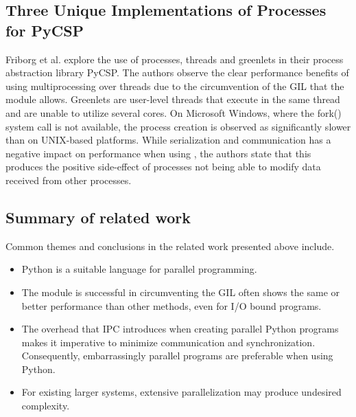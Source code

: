 \subsection{Three Unique Implementations of Processes for PyCSP}
Friborg et al. \cite{friborg_2009_three_tuiopfp} explore the use of processes, threads and greenlets in their process abstraction
library PyCSP. The authors observe the clear performance benefits of using multiprocessing over threads due to the circumvention of the GIL
that the  module allows. Greenlets are user-level threads that execute in the same thread and are unable to utilize
several cores. On Microsoft Windows, where the fork() system call is not available, the process creation is observed as
significantly slower than on UNIX-based platforms. While serialization and communication has a negative impact on performance when
using , the authors state that this produces the positive side-effect of processes not being able to
modify data received from other processes.

\subsection{Summary of related work}
Common themes and conclusions in the related work presented above include.

\begin{itemize}
  \item Python is a suitable language for parallel programming.
  \item The  module is successful in circumventing the GIL often shows the same or better performance than other
    methods, even for I/O bound programs.
  \item The overhead that IPC introduces when creating parallel Python programs makes it imperative to minimize communication and
    synchronization. Consequently, embarrassingly parallel programs are preferable when using Python.
  \item For existing larger systems, extensive parallelization may produce undesired complexity.
\end{itemize}
